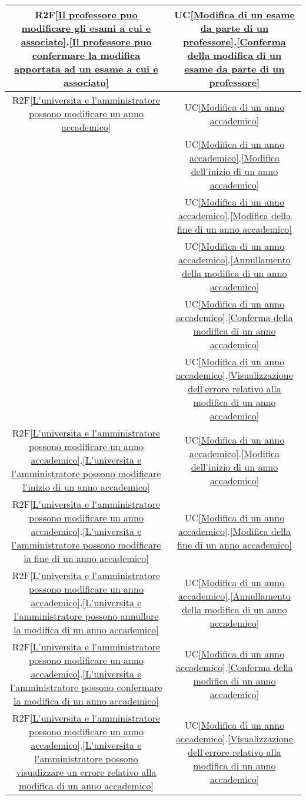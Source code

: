 \begin{longtable}{|c|c|}
\hline
R2F\ref{Il professore puo modificare gli esami a cui e associato}.\ref{Il professore puo confermare la modifica apportata ad un esame a cui e associato} & UC\ref{Modifica di un esame da parte di un professore}.\ref{Conferma della modifica di un esame da parte di un professore}\\
\hline
R2F\ref{L'universita e l'amministratore possono modificare un anno accademico} & UC\ref{Modifica di un anno accademico}\\
& UC\ref{Modifica di un anno accademico}.\ref{Modifica dell'inizio di un anno accademico}\\
& UC\ref{Modifica di un anno accademico}.\ref{Modifica della fine di un anno accademico}\\
& UC\ref{Modifica di un anno accademico}.\ref{Annullamento della modifica di un anno accademico}\\
& UC\ref{Modifica di un anno accademico}.\ref{Conferma della modifica di un anno accademico}\\
& UC\ref{Modifica di un anno accademico}.\ref{Visualizzazione dell'errore relativo alla modifica di un anno accademico}\\
\hline
R2F\ref{L'universita e l'amministratore possono modificare un anno accademico}.\ref{L'universita e l'amministratore possono modificare l'inizio di un anno accademico} & UC\ref{Modifica di un anno accademico}.\ref{Modifica dell'inizio di un anno accademico}\\
\hline
R2F\ref{L'universita e l'amministratore possono modificare un anno accademico}.\ref{L'universita e l'amministratore possono modificare la fine di un anno accademico} & UC\ref{Modifica di un anno accademico}.\ref{Modifica della fine di un anno accademico}\\
\hline
R2F\ref{L'universita e l'amministratore possono modificare un anno accademico}.\ref{L'universita e l'amministratore possono annullare la modifica di un anno accademico} & UC\ref{Modifica di un anno accademico}.\ref{Annullamento della modifica di un anno accademico}\\
\hline
R2F\ref{L'universita e l'amministratore possono modificare un anno accademico}.\ref{L'universita e l'amministratore possono confermare la modifica di un anno accademico} & UC\ref{Modifica di un anno accademico}.\ref{Conferma della modifica di un anno accademico}\\
\hline
R2F\ref{L'universita e l'amministratore possono modificare un anno accademico}.\ref{L'universita e l'amministratore possono visualizzare un errore relativo alla modifica di un anno accademico} &  UC\ref{Modifica di un anno accademico}.\ref{Visualizzazione dell'errore relativo alla modifica di un anno accademico}\\

\end{longtable}
